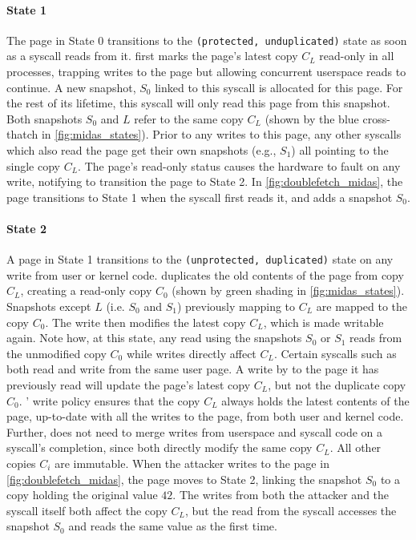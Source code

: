 \documentclass[letterpaper,twocolumn,10pt]{article}
\begin{document}
\paragraph{State 1}
The page in State 0 transitions to the \texttt{(protected, unduplicated)} state as soon as a syscall
reads from it.
\midas first marks the page's latest copy $C_L$ read-only in all processes,
trapping writes to the page but allowing concurrent userspace reads to continue.
A new snapshot, $S_0$ linked to this syscall is allocated for this page.
For the rest of its lifetime, this syscall will only read this page from this snapshot.
Both snapshots $S_0$ and $L$ refer to the same copy $C_L$ (shown by the
blue cross-thatch in \autoref{fig:midas_states}).
Prior to any writes to this page, any other syscalls which also read the page
get their own snapshots (e.g., $S_1$) all pointing to the single copy $C_L$.
The page's read-only status causes the hardware to fault on any write,
notifying \midas to transition the page to State 2.
In \autoref{fig:doublefetch_midas}, the page transitions to State 1 when
the syscall first reads it, and adds a snapshot $S_0$.

\paragraph{State 2}
A page in State 1 transitions to the \texttt{(unprotected, duplicated)} state
on any write from user or kernel code.
\midas duplicates the old contents of the page from copy $C_L$, creating a
read-only copy $C_0$ (shown by green shading in \autoref{fig:midas_states}).
Snapshots except $L$ (i.e. $S_0$ and $S_1$) previously mapping to $C_L$ are
mapped to the copy $C_0$.
The write then modifies the latest copy $C_L$, which is made writable again.
Note how, at this state, any read using the snapshots $S_0$ or $S_1$ reads
from the unmodified copy $C_0$ while writes directly affect $C_L$.
Certain syscalls such as  both read and write from
the same user page.
A write by  to the page it has previously read will update
the page's latest copy $C_L$, but not the duplicate copy $C_0$.
\midas' write policy ensures that the copy $C_L$ always holds the latest
contents of the page, up-to-date with all the writes to the page, from both user
and kernel code.
Further, \midas does not need to merge writes from userspace and syscall code
on a syscall's completion, since both directly modify the same copy $C_L$.
All other copies $C_i$ are immutable.
When the attacker writes to the page in \autoref{fig:doublefetch_midas}, the
page moves to State 2, linking the snapshot $S_0$ to a copy holding the
original value $42$.
The writes from both the attacker and the syscall itself both affect
the copy $C_L$, but the read from the syscall accesses the snapshot $S_0$
and reads the same value as the first time.
\end{document}
